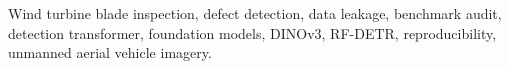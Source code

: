 \documentclass[journal]{IEEEtran}
\begin{document}
\begin{IEEEkeywords}
Wind turbine blade inspection, defect detection, data leakage, benchmark audit, detection transformer, foundation models, DINOv3, RF-DETR, reproducibility, unmanned aerial vehicle imagery.
\end{IEEEkeywords}













\clearpage
\appendices


\clearpage
\twocolumn




\end{document}
